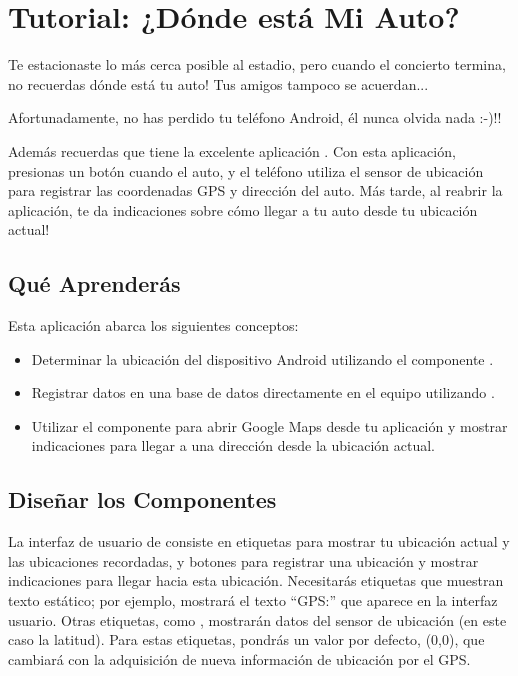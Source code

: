 \section{Tutorial: ¿Dónde está Mi Auto?}

Te estacionaste lo más cerca posible al estadio, pero cuando el
concierto termina, no recuerdas dónde está tu auto! Tus amigos tampoco
se acuerdan...

Afortunadamente, no has perdido tu teléfono Android, él nunca olvida
nada :-)!!

Además recuerdas que tiene la excelente aplicación . Con esta aplicación, presionas un botón cuando el auto, y el teléfono utiliza el sensor de ubicación para registrar las
coordenadas GPS y dirección del auto. Más tarde, al reabrir la
aplicación, te da indicaciones sobre cómo llegar a tu auto desde tu
ubicación actual!

\subsection*{Qué Aprenderás}

Esta aplicación abarca los siguientes conceptos:

\begin{itemize}

\item Determinar la ubicación del dispositivo Android utilizando el
  componente .

\item Registrar datos en una base de datos directamente en el equipo
  utilizando .

\item Utilizar el componente  para abrir
  Google Maps desde tu aplicación y mostrar indicaciones para llegar a
  una dirección desde la ubicación actual.
\end{itemize}

\subsection*{Diseñar los Componentes}

La interfaz de usuario de  consiste en
etiquetas para mostrar tu ubicación actual y las ubicaciones
recordadas, y botones para registrar una ubicación y mostrar
indicaciones para llegar hacia esta ubicación. Necesitarás etiquetas
que muestran texto estático; por ejemplo, 
mostrará el texto ``GPS:'' que aparece en la interfaz usuario. Otras
etiquetas, como , mostrarán datos del
sensor de ubicación (en este caso la latitud). Para estas etiquetas,
pondrás un valor por defecto, (0,0), que cambiará con la adquisición
de nueva información de ubicación por el GPS.

